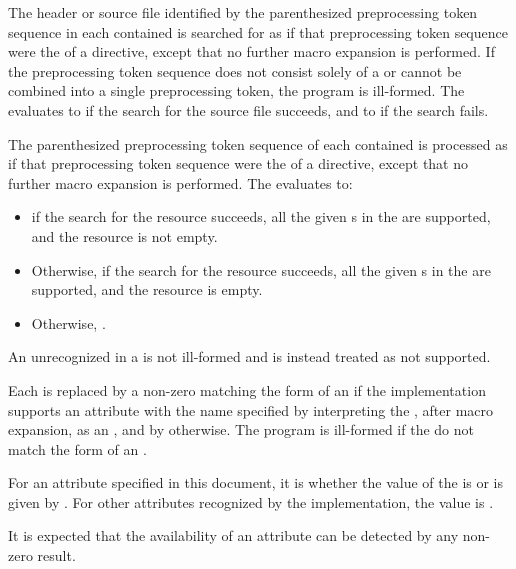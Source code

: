 \pnum
The header or source file identified by
the parenthesized preprocessing token sequence
in each contained 
is searched for as if that preprocessing token sequence
were the  of a  directive,
except that no further macro expansion is performed.
If the preprocessing token sequence does not consist solely of a 
or cannot be combined into a single
 preprocessing token, the program is ill-formed.
The  evaluates
to  if the search for the source file succeeds, and
to  if the search fails.

\pnum
The parenthesized preprocessing token sequence of each contained
 is processed as if that
preprocessing token sequence were the 
of a  directive,
except that no further macro expansion is performed.
The  evaluates to:
\begin{itemize}
\item
{} if the search for the resource succeeds,
all the given s in the 
are supported, and the resource is not empty.
\item
Otherwise,  if the search for the resource succeeds,
all the given s in the 
are supported, and the resource is empty.
\item
Otherwise, .
\end{itemize}
\begin{note}
An unrecognized  in a 
is not ill-formed and is instead treated as not supported.
\end{note}

\pnum
Each  is replaced by
a non-zero 
matching the form of an 
if the implementation supports an attribute
with the name specified by interpreting
the , after macro expansion,
as an ,
and by  otherwise.
The program is ill-formed if the 
do not match the form of an .

\pnum
For an attribute specified in this document,
it is 
whether the value of the 
is  or is given by .
For other attributes recognized by the implementation,
the value is
.
\begin{note}
It is expected
that the availability of an attribute can be detected by any non-zero result.
\end{note}

